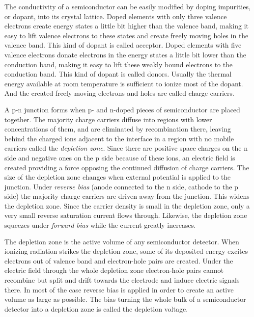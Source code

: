 The conductivity of a semiconductor can be easily modified by doping impurities, or dopant, into its crystal lattice. Doped elements with only three valence electrons create energy states a little bit higher than the valence band, making it easy to lift valence electrons to these states and create freely moving holes in the valence band. This kind of dopant is called acceptor. Doped elements with five valence electrons donate electrons in the energy states a little bit lower than the conduction band, making it easy to lift these weakly bound electrons to the conduction band. This kind of dopant is called donors. Usually the thermal energy available at room temperature is sufficient to ionize most of the dopant. And the created freely moving electrons and holes are called charge carriers.

A p-n junction forms when p- and n-doped pieces of semiconductor are placed together. The majority charge carriers diffuse into regions with lower concentrations of them, and are eliminated by recombination there, leaving behind the charged ions adjacent to the interface in a region with no mobile carriers called the \emph{depletion zone}. Since there are positive space charges on the n side and negative ones on the p side because of these ions, an electric field is created providing a force opposing the continued diffusion of charge carriers. The size of the depletion zone changes when external potential is applied to the junction. Under \emph{reverse bias} (anode connected to the n side, cathode to the p side) the majority charge carriers are driven away from the junction. This widens the depletion zone. Since the carrier density is small in the depletion zone, only a very small reverse saturation current flows through. Likewise, the depletion zone squeezes under \emph{forward bias} while the current greatly increases.

The depletion zone is the active volume of any semiconductor detector. When ionizing radiation strikes the depletion zone, some of its deposited energy excites electrons out of valence band and electron-hole pairs are created. Under the electric field through the whole depletion zone electron-hole pairs cannot recombine but split and drift towards the electrode and induce electric signals there. In most of the case reverse bias is applied in order to create an active volume as large as possible. The bias turning the whole bulk of a semiconductor detector into a depletion zone is called the depletion voltage.

